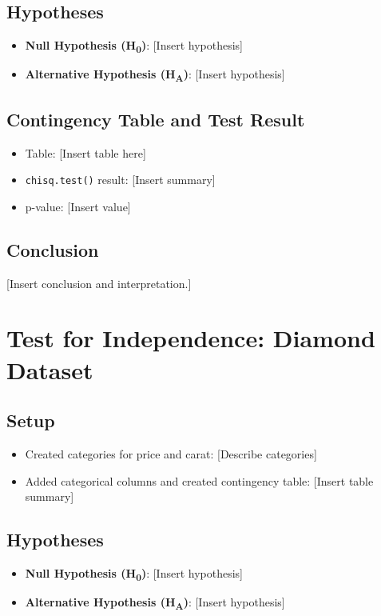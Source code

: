 \documentclass{article}
\begin{document}
\subsection{Hypotheses}
\begin{itemize}
    \item \textbf{Null Hypothesis (H\textsubscript{0})}: [Insert hypothesis]
    \item \textbf{Alternative Hypothesis (H\textsubscript{A})}: [Insert hypothesis]
\end{itemize}

\subsection{Contingency Table and Test Result}
\begin{itemize}
    \item Table: [Insert table here]
    \item \texttt{chisq.test()} result: [Insert summary]
    \item p-value: [Insert value]
\end{itemize}

\subsection{Conclusion}
[Insert conclusion and interpretation.]

\section{Test for Independence: Diamond Dataset}
\subsection{Setup}
\begin{itemize}
    \item Created categories for price and carat: [Describe categories]
    \item Added categorical columns and created contingency table: [Insert table summary]
\end{itemize}

\subsection{Hypotheses}
\begin{itemize}
    \item \textbf{Null Hypothesis (H\textsubscript{0})}: [Insert hypothesis]
    \item \textbf{Alternative Hypothesis (H\textsubscript{A})}: [Insert hypothesis]
\end{itemize}
\end{document}
